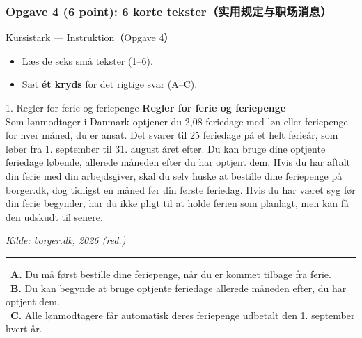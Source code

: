 \subsubsection*{Opgave 4 (6 point): 6 korte tekster（实用规定与职场消息）}

\begin{emailbox}{Kursistark --- Instruktion（Opgave 4）}
\begin{itemize}
  \item Læs de seks små tekster (1--6).
  \item Sæt \textbf{ét kryds} for det rigtige svar (A--C).
\end{itemize}
\end{emailbox}

\begin{emailbox}{1. Regler for ferie og feriepenge}
\textbf{Regler for ferie og feriepenge}\\
Som lønmodtager i Danmark optjener du 2,08 feriedage med løn eller feriepenge for hver måned, du er ansat. Det svarer til 25 feriedage på et helt ferieår, som løber fra 1. september til 31. august året efter. Du kan bruge dine optjente feriedage løbende, allerede måneden efter du har optjent dem. Hvis du har aftalt din ferie med din arbejdsgiver, skal du selv huske at bestille dine feriepenge på borger.dk, dog tidligst en måned før din første feriedag. Hvis du har været syg før din ferie begynder, har du ikke pligt til at holde ferien som planlagt, men kan få den udskudt til senere.
\par\noindent\hfill {\small\textit{Kilde: borger.dk, 2026 (red.)}}

\vspace{0.3em}
\hrule
\vspace{0.3em}
\small
\fbox{\phantom{X}}\ \textbf{A.} Du må først bestille dine feriepenge, når du er kommet tilbage fra ferie.\\[0.25em]
\fbox{\phantom{X}}\ \textbf{B.} Du kan begynde at bruge optjente feriedage allerede måneden efter, du har optjent dem.\\[0.25em]
\fbox{\phantom{X}}\ \textbf{C.} Alle lønmodtagere får automatisk deres feriepenge udbetalt den 1. september hvert år.
\end{emailbox}

